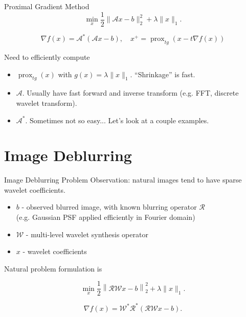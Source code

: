 \documentclass[xcolor=dvipsnames,t]{beamer} %
\begin{document}
\begin{frame}{Proximal Gradient Method}
   \[ \min_x \dfrac{1}{2}\|\mathcal{A}x-b\|_2^2 + \lambda \|x\|_1. \] 

   \[ \nabla f(x) = \mathcal{A}^\ast\left(\mathcal{A}x-b\right), \quad x^{+} = \operatorname{prox}_{t g}\left(x - t\nabla f(x)\right)\] 

   \noindent Need to efficiently compute
   \begin{itemize}
      \item $\operatorname{prox}_{tg}(x)$ with $g(x) = \lambda \|x\|_1$.  ``Shrinkage'' is fast.
      \item $\mathcal{A}$.  Usually have fast forward and inverse transform (e.g. FFT, discrete wavelet transform).
      \item $\mathcal{A}^\ast$.  Sometimes not so easy...  Let's look at a couple examples.
   \end{itemize}
\end{frame}



\section{Image Deblurring}
\begin{frame}{Image Deblurring Problem}
   Observation: natural images tend to have sparse wavelet coefficients.\\
   
   \begin{itemize}
      \item $b$ - observed blurred image, with known blurring operator $\mathcal{R}$\\ (e.g. Gaussian PSF applied efficiently in Fourier domain)
      \item $\mathcal{W}$ - multi-level wavelet synthesis operator
      \item $x$ - wavelet coefficients
   \end{itemize}

   Natural problem formulation is

   \[ \min_x \dfrac{1}{2}\left\|\mathcal{RW}x-b\right\|_2^2 + \lambda \|x\|_1. \]

   \[ \nabla f(x) = \mathcal{W}^\ast\mathcal{R}^\ast\left(\mathcal{RW}x-b\right). \] 

\end{frame}
\end{document}
